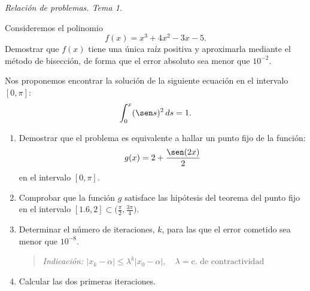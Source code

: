 \documentclass[11pt]{article}
\begin{document}
\begin{flushright}
  \LARGE\it Relación de problemas. Tema \huge 1.\\
  \bigskip
\end{flushright}

\begin{problemas}

  \begin{problema}
    Consideremos el polinomio
    $$
    f(x) = x^3 + 4x^2 -3x -5.
    $$
    Demostrar que $f(x)$ tiene una única raíz positiva y aproximarla mediante el
    método de bisección, de forma que el error absoluto sea menor que $10^{-2}$.
  \end{problema}
  \begin{problema}
    Nos proponemos encontrar la solución de la siguiente ecuación en
    el intervalo $[0,\pi]$:
    $$
    \int_0^x (\sen s)^2 \, ds = 1.
    $$

    \begin{enumerate}
    \item Demostrar que el problema es equivalente a hallar un punto
      fijo de la función:
      $$
      g(x)=2 + \frac{\sen(2x)}{2}
      $$
      en el intervalo $[0,\pi]$.
    \item Comprobar que la función $g$ satisface las hipótesis del
      teorema del punto fijo en el intervalo $\displaystyle [1.6,2]\subset
      \bigg(\frac{\pi}{2},\frac{3\pi}{4}\bigg)$.
    \item Determinar el número de iteraciones, $k$, para las que el
      error cometido sea menor que $10^{-8}$.
      \begin{quote}\em\small
        Indicación:
        $|x_k-\alpha|\le \lambda^k|x_0-\alpha|,
        \quad\lambda=\text{c. de contractividad}$
      \end{quote}
    \item Calcular las dos primeras iteraciones.
    \end{enumerate}
  \end{problema}



\end{problemas}
\end{document}
